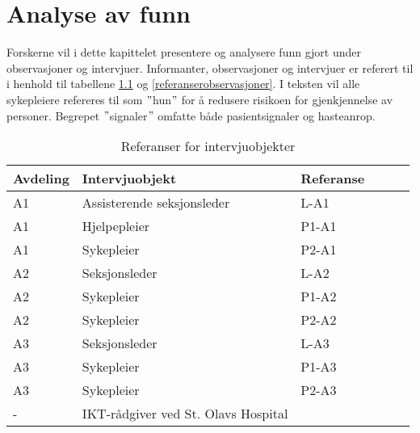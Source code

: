 \chapter{Analyse av funn}
\label{chp:analyseavfunn}

Forskerne vil i dette kapittelet presentere og analysere funn gjort under observasjoner og intervjuer. Informanter, observasjoner og intervjuer er referert til i henhold til tabellene \ref{referanserintervju} og \ref{referanserobservasjoner}. I teksten vil alle sykepleiere refereres til som $"$hun$"$ for å redusere risikoen for gjenkjennelse av personer. Begrepet $"$signaler$"$ omfatte både pasientsignaler og hasteanrop.

\begin{table}[H]\centering
    \begin{tabular}{ |l|l|l|l|l|l| }
    \hline
    Avdeling & Intervjuobjekt & Referanse \\ \hline
       A1 & Assisterende seksjonsleder & L-A1 \\ \hline
       A1 & Hjelpepleier & P1-A1 \\ \hline
       A1 & Sykepleier & P2-A1 \\ \hline
       A2 & Seksjonsleder & L-A2 \\ \hline
       A2 & Sykepleier & P1-A2 \\ \hline
       A2 & Sykepleier & P2-A2 \\ \hline
       A3 & Seksjonsleder & L-A3 \\ \hline
       A3 & Sykepleier & P1-A3 \\ \hline
       A3 & Sykepleier & P2-A3 \\ \hline
       - & IKT-rådgiver ved St. Olavs Hospital &  \\ \hline
    \end{tabular}
    \caption {Referanser for intervjuobjekter}
    \label{referanserintervju}
\end{table}

